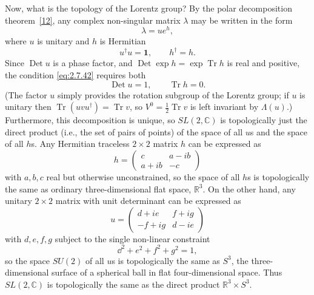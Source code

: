 Now, what is the topology of the Lorentz group? By the polar decomposition
theorem~\hyperref[ref:2.12]{[12]}, any complex non-singular matrix $\lambda$ may be
written in the form
\begin{equation*}
  \lambda=u e^h,
\end{equation*}
where $u$ is unitary and $h$ is Hermitian
\begin{equation*}
  u^\dagger u=\mathbf{1},
  \qquad
  h^\dagger=h.
\end{equation*}
Since $\operatorname{Det}u$ is a phase factor, and
$\operatorname{Det}\exp h=\exp\operatorname{Tr}h$ is real and positive, the
condition \eqref{eq:2.7.42} requires both
\begin{equation*}
  \operatorname{Det}u=1,
  \qquad
  \operatorname{Tr}h=0.
\end{equation*}
(The factor $u$ simply provides the rotation subgroup of the Lorentz group; if
$u$ is unitary then $\operatorname{Tr}(uvu^\dagger)=\operatorname{Tr}v$, so
$V^0=\tfrac12\operatorname{Tr}v$ is left invariant by $\Lambda(u)$.)
Furthermore, this decomposition is unique, so $SL(2,\mathbb{C})$ is topologically just
the direct product (i.e., the set of pairs of points) of the space of all $u$s
and the space of all $h$s. Any Hermitian traceless $2\times2$ matrix $h$ can be
expressed as
\begin{equation*}
  h=\begin{pmatrix}
    c & a-ib\\
    a+ib & -c
  \end{pmatrix}
\end{equation*}
with $a,b,c$ real but otherwise unconstrained, so the space of all $h$s is
topologically the same as ordinary three-dimensional flat space, $\mathbb{R}^3$. On the
other hand, any unitary $2\times2$ matrix with unit determinant can be expressed
as
\begin{equation*}
  u=\begin{pmatrix}
    d+ie & f+ig\\
    -f+ig & d-ie
  \end{pmatrix}
\end{equation*}
with $d,e,f,g$ subject to the single non-linear constraint
\begin{equation*}
  \dd^2+e^2+f^2+g^2=1,
\end{equation*}
so the space $SU(2)$ of all $u$s is topologically the same as $S^3$, the
three-dimensional surface of a spherical ball in flat four-dimensional space.
Thus $SL(2,\mathbb{C})$ is topologically the same as the direct product $\mathbb{R}^3\times S^3$.
